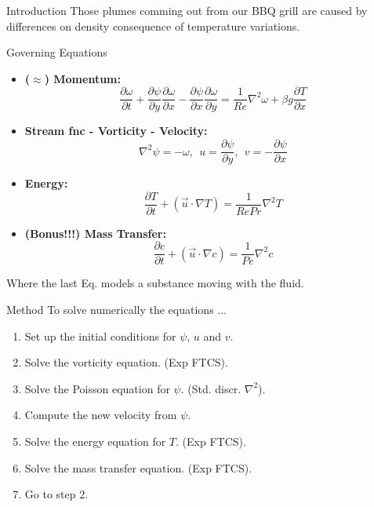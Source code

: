 \documentclass[final]{beamer}
\newlength{\onecolwid}
\begin{document}
\begin{frame}[t]
\begin{columns}[t]
\begin{column}{\onecolwid}
\begin{block}{Introduction}
Those plumes comming out from our BBQ grill are caused by differences on density consequence of temperature variations.
\vspace{1em}
\begin{alertblock}{Governing Equations}
\begin{itemize}
\item \textbf{($\approx$) Momentum:}
$$\frac{\partial\omega}{\partial t}+\frac{\partial\psi}{\partial y}\frac{\partial\omega}{\partial x}-\frac{\partial\psi}{\partial x}\frac{\partial\omega}{\partial y}=\frac{1}{Re}\nabla^{2}\omega+\beta g\frac{\partial T}{\partial x}$$
\item \textbf{Stream fnc - Vorticity - Velocity:}
$$\nabla^{2}\psi=-\omega,\:\: u=\frac{\partial\psi}{\partial y},\:\: v=-\frac{\partial\psi}{\partial x}$$
\item \textbf{Energy:}
$$\frac{\partial T}{\partial t}+\left(\overrightarrow{u}\cdot\nabla T\right)=\frac{1}{RePr}\nabla^{2}T$$
\item \textbf{(Bonus!!!) Mass Transfer:}
$$\frac{\partial c}{\partial t}+\left(\overrightarrow{u}\cdot\nabla c\right)=\frac{1}{Pe}\nabla^{2}c$$
\end{itemize}
\end{alertblock}
Where the last Eq. models a substance moving with the fluid.
\end{block}

\vspace{-1em}
\begin{block}{Method}
To solve numerically the equations ...
\begin{enumerate}
\item Set up the initial conditions for $\psi$, $u$ and $v$.
\item Solve the vorticity equation. (Exp FTCS).
\item Solve the Poisson equation for $\psi$. (Std. discr. $\nabla^{2}$).
\item Compute the new velocity from $\psi$.
\item Solve the energy equation for $T$. (Exp FTCS).
\item Solve the mass transfer equation. (Exp FTCS).
\item Go to step 2.
\end{enumerate}
\end{block}


\end{column}
\end{columns}
\end{frame}
\end{document}
